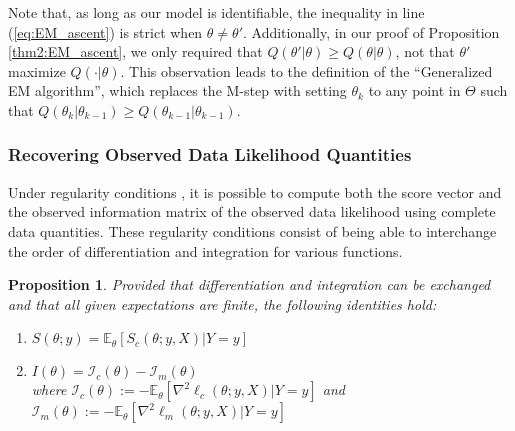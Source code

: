 \documentclass[11pt, oneside]{article}   	%
\newcommand{\bE}{\mathbb{E}}
\newtheorem{proposition}{Proposition}[section]
\begin{document}
Note that, as long as our model is identifiable, the inequality in line (\ref{eq:EM_ascent}) is strict when $\theta \neq \theta'$. Additionally, in our proof of Proposition \ref{thm2:EM_ascent}, we only required that $Q(\theta'|\theta) \geq Q(\theta|\theta)$, not that $\theta'$ maximize $Q(\cdot|\theta)$. This observation leads to the definition of the ``Generalized EM algorithm'', which replaces the M-step with setting $\theta_k$ to any point in $\Theta$ such that $Q(\theta_k|\theta_{k-1}) \geq Q(\theta_{k-1}|\theta_{k-1})$.



\subsubsection{Recovering Observed Data Likelihood Quantities}

Under regularity conditions \citep[see][]{McL08}, it is possible to compute both the score vector and the observed information matrix of the observed data likelihood using complete data quantities. These regularity conditions consist of being able to interchange the order of differentiation and integration for various functions.

\begin{proposition}
    \label{thm2:EM_decomp}
    Provided that differentiation and integration can be exchanged and that all given expectations are finite, the following identities hold:
    \begin{enumerate}[label=(\roman*)]
        \item $S(\theta; y) = \bE_\theta [S_c(\theta; y, X)|Y=y]$ \label{eq:obs_score_identity}
        \item $I(\theta) = \mathcal{I}_c(\theta) - \mathcal{I}_m(\theta)$ \label{eq:obs_info_identity}\\
        where $\mathcal{I}_c(\theta) := - \bE_\theta \left[ \nabla^2 \ell_c(\theta; y, X) | Y=y \right]$ and $\mathcal{I}_m(\theta) := - \bE_\theta \left[ \nabla^2 \ell_m(\theta; y, X) | Y=y \right]$
    \end{enumerate}
\end{proposition}
\end{document}
